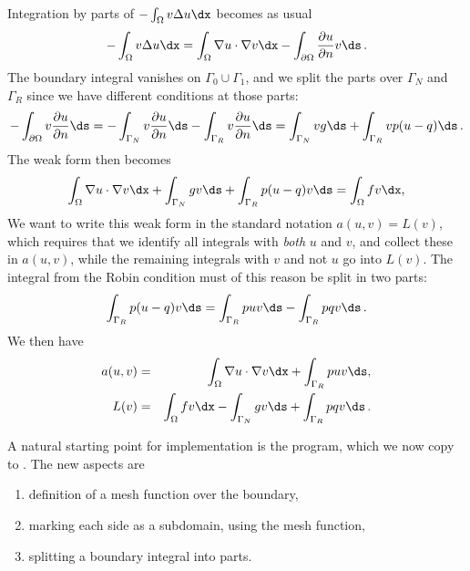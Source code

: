 Integration by parts of $-\int_\Omega v\Delta u\dx$ becomes
as usual
\[
 -\int_\Omega v\Delta u \dx
= \int_\Omega\nabla u\cdot \nabla v\dx
  - \int_{\partial\Omega} \frac{\partial u}{\partial n}v\ds\langtangenep
\]
The boundary integral vanishes on $\Gamma_0\cup\Gamma_1$, and
we split the parts over $\Gamma_N$ and $\Gamma_R$ since we have
different conditions at those parts:
\[
- \int_{\partial\Omega}v \frac{\partial u}{\partial n}\ds
=
-\int_{\Gamma_N}v \frac{\partial u}{\partial n}\ds
 - \int_{\Gamma_R}v \frac{\partial u}{\partial n}\ds
= \int_{\Gamma_N}vg\ds
+ \int_{\Gamma_R}vp(u-q)\ds\langtangenep
\]
The weak form then becomes
\[
\int_{\Omega} \nabla u\cdot \nabla v \dx
+ \int_{\Gamma_N} gv\ds + \int_{\Gamma_R}p(u-q)v\ds
= \int_{\Omega} fv \dx,
\]
We want to write this weak form in the standard
notation $a(u,v)=L(v)$, which
requires that we identify all integrals with \emph{both} $u$ and $v$,
and collect these in $a(u,v)$, while the remaining integrals with
$v$ and not $u$ go
into $L(v)$.
The integral from the Robin condition must of this reason be split in two
parts:
\[ \int_{\Gamma_R}p(u-q)v\ds
= \int_{\Gamma_R}puv\ds - \int_{\Gamma_R}pqv\ds\langtangenep
\]
We then have
\begin{eqnarray}
a(u, v) &=& \int_{\Omega} \nabla u\cdot \nabla v \dx
+ \int_{\Gamma_R}puv\ds,
\label{langtangen:poisson:2D:DN3:var:a}\\
L(v) &=& \int_{\Omega} fv \dx -
\int_{\Gamma_N} g v\ds + \int_{\Gamma_R}pqv\ds\langtangenep
\label{langtangen:poisson:2D:DN3:var:L}
\end{eqnarray}

A natural starting point for implementation is
the  program, which we now copy to
.
The new aspects are
\begin{enumerate}
\item definition of a mesh function over the boundary,
\item marking each side as a subdomain, using the mesh function,
\item splitting a boundary integral into parts.
\end{enumerate}

